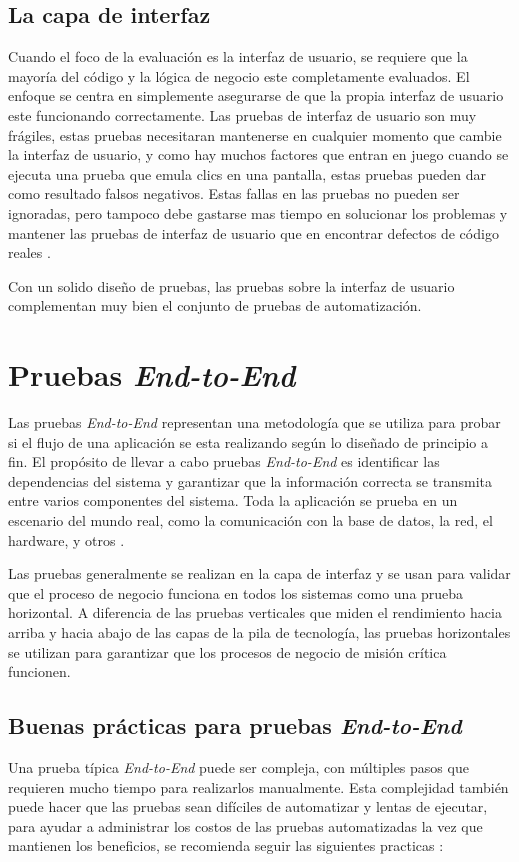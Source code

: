 \subsection{La capa de interfaz}
Cuando el foco de la evaluación es la interfaz de usuario, se requiere que la
mayoría del código y la lógica de negocio este completamente evaluados. El
enfoque se centra en simplemente asegurarse de que la propia interfaz de
usuario este funcionando correctamente. Las pruebas de interfaz de usuario son
muy frágiles, estas pruebas necesitaran mantenerse en cualquier momento que
cambie la interfaz de usuario, y como hay muchos factores que entran en juego
cuando se ejecuta una prueba que emula clics en una pantalla, estas pruebas
pueden dar como resultado falsos negativos. Estas fallas en las pruebas no
pueden ser ignoradas, pero tampoco debe gastarse mas tiempo en solucionar los
problemas y mantener las pruebas de interfaz de usuario que en encontrar
defectos de código reales \cite{Francino}.

Con un solido diseño de pruebas, las pruebas sobre la interfaz de usuario
complementan muy bien el conjunto de pruebas de automatización.

\section{Pruebas \emph{End-to-End}}
Las pruebas \emph{End-to-End} representan una metodología que se utiliza para
probar si el flujo de una aplicación se esta realizando según lo diseñado de
principio a fin. El propósito de llevar a cabo pruebas \emph{End-to-End} es
identificar las dependencias del sistema y garantizar que la información
correcta se transmita entre varios componentes del sistema. Toda la aplicación
se prueba en un escenario del mundo real, como la comunicación con la base de
datos, la red, el hardware, y otros \cite{Sharma}.

Las pruebas generalmente se realizan en la capa de interfaz y se usan para
validar que el proceso de negocio funciona en todos los sistemas como una
prueba horizontal. A diferencia de las pruebas verticales que miden el
rendimiento hacia arriba y hacia abajo de las capas de la pila de tecnología,
las pruebas horizontales se utilizan para garantizar que los procesos de negocio
de misión crítica funcionen.

\subsection{Buenas prácticas para pruebas \emph{End-to-End}}
Una prueba típica \emph{End-to-End} puede ser compleja, con múltiples pasos que
requieren mucho tiempo para realizarlos manualmente. Esta complejidad también
puede hacer que las pruebas sean difíciles de automatizar y lentas de ejecutar,
para ayudar a administrar los costos de las pruebas automatizadas  la vez que
mantienen los beneficios, se recomienda seguir las siguientes practicas
\cite{King}:

